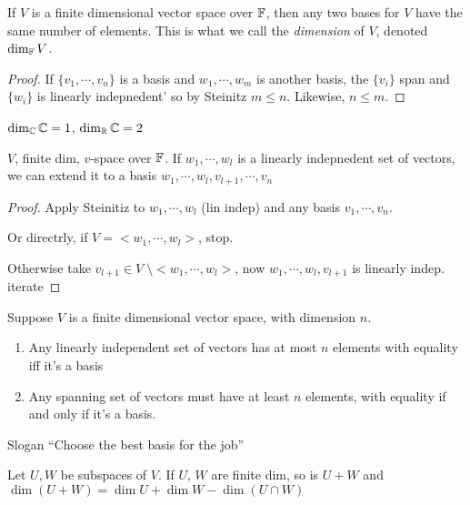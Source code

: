 \documentclass[a4paper]{article}
\begin{document}
\begin{thm} 
	If $ V $ is a finite dimensional vector space over $ \mathbb{F} $, then any two bases for $ V $ have the same number of elements. This is what we call the \emph{dimension} of $ V $, denoted $ \dim_{\mathbb{F}} V $.
\end{thm}

\begin{proof}
	If $ \{  v_{1},\cdots,v_{n} \} $ is a basis and $ w_{1},\cdots,w_{m} $ is another basis, the $ \{ v_{i} \} $ span and $ \{ w_{i} \} $ is linearly indepnedent' so by Steinitz $ m \leq n $. Likewise, $ n \leq m $.
\end{proof}


\begin{eg}
	$ \dim_{\mathbb{C}} \mathbb{C} = 1 $, $ \dim_{\mathbb{R}} \mathbb{C} = 2 $
\end{eg}

\begin{thm} 
	$ V $, finite dim, $ v $-space over $ \mathbb{F} $. If $ w_{1},\cdots,w_{l}$ is a linearly indepnedent set of vectors, we can extend it to a basis $ w_{1},\cdots,w_{l},v_{l+1},\cdots,v_{n} $
\end{thm}


\begin{proof}
	Apply Steinitiz to $ w_{1},\cdots,w_{l} $ (lin indep) and any basis $ v_{1},\cdots,v_{n} $.
	
	Or directrly, if $ V = <w_{1},\cdots,w_{l} > $, stop.
	
	Otherwise take $ v_{l+1} \in V \; \setminus <w_{1},\cdots,w_{l} > $, now $ w_{1},\cdots,w_{l},v_{l+1} $ is linearly indep. iterate
\end{proof}


\begin{cor} 
	Suppose $ V $ is a finite dimensional vector space, with dimension $ n $.
	
	\begin{enumerate}
		\item Any linearly independent set of vectors has at most $ n $ elements with equality iff it's a basis
		\item Any spanning set of vectors must have at least $ n $ elements, with equality if and only if it's a basis.
		
	\end{enumerate}
\end{cor}

Slogan ``Choose the best basis for the job''

\begin{thm} 
	Let $ U,W $ be subspaces of $ V $. If $ U $, $ W $ are finite dim, so is $ U + W $ and $ \dim (U + W)   = \dim U + \dim W - \dim (U \cap W)  $
\end{thm}
\end{document}
